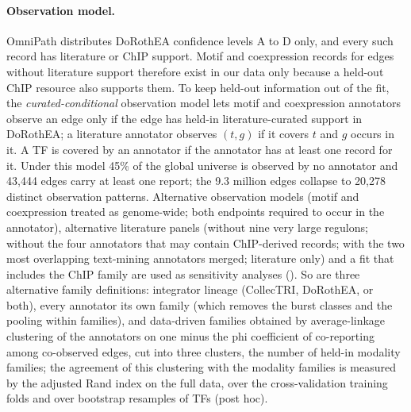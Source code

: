 \documentclass[11pt,a4paper]{article}
\begin{document}
\paragraph{Observation model.}
OmniPath distributes DoRothEA confidence levels A to D only, and every such record has literature or ChIP support.
Motif and coexpression records for edges without literature support therefore exist in our data only because a held-out ChIP resource also supports them.
To keep held-out information out of the fit, the \emph{curated-conditional} observation model lets motif and coexpression annotators observe an edge only if the edge has held-in literature-curated support in DoRothEA; a literature annotator observes $(t,g)$ if it covers $t$ and $g$ occurs in it.
A TF is covered by an annotator if the annotator has at least one record for it.
Under this model 45\% of the global universe is observed by no annotator and 43{,}444 edges carry at least one report; the 9.3 million edges collapse to 20{,}278 distinct observation patterns.
Alternative observation models (motif and coexpression treated as genome-wide; both endpoints required to occur in the annotator), alternative literature panels (without nine very large regulons; without the four annotators that may contain ChIP-derived records; with the two most overlapping text-mining annotators merged; literature only) and a fit that includes the ChIP family are used as sensitivity analyses ().
So are three alternative family definitions: integrator lineage (CollecTRI, DoRothEA, or both), every annotator its own family (which removes the burst classes and the pooling within families), and data-driven families obtained by average-linkage clustering of the annotators on one minus the phi coefficient of co-reporting among co-observed edges, cut into three clusters, the number of held-in modality families; the agreement of this clustering with the modality families is measured by the adjusted Rand index on the full data, over the cross-validation training folds and over bootstrap resamples of TFs (post hoc).
\end{document}
